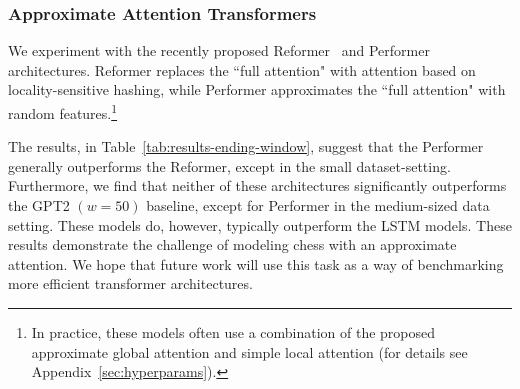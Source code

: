 \subsubsection{Approximate Attention Transformers}
\label{sec:limited_history}

We experiment with the recently proposed Reformer~\cite{kitaev2020reformer} and Performer~\cite{choromanski2021rethinking} architectures. Reformer replaces the ``full attention" with attention based on locality-sensitive hashing, while Performer approximates the ``full attention" with random features.\footnote{In practice, these models often use a combination of the proposed approximate global attention and simple local attention (for details see Appendix~\ref{sec:hyperparams}).}

The results, in Table~\ref{tab:results-ending-window}, suggest that the Performer generally outperforms the Reformer, except in the small dataset-setting. Furthermore, we find that neither of these architectures significantly outperforms the GPT2 $(w = 50)$ baseline, except for Performer in the medium-sized data setting. 
These models do, however, typically outperform the LSTM models. 
These results demonstrate the challenge of modeling chess with an approximate attention. 
We hope that future work will use this task as a way of benchmarking more efficient transformer architectures. %













